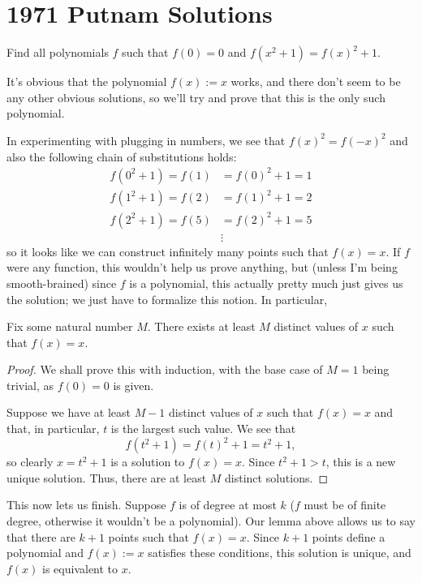 \documentclass[a4paper, 12pt]{article}
\begin{document}
\section*{1971 Putnam Solutions}

\begin{sidebox}
    \begin{problem}[A2]
        Find all polynomials \( f \) such that \( f(0) = 0 \) and \( f(x^2 + 1) = f(x)^2 + 1 \).
    \end{problem}
\end{sidebox}

\begin{solution}
    It's obvious that the polynomial \( f(x) := x \) works, and there don't seem to be any other obvious solutions, so we'll try and prove that this is the only such polynomial.

    In experimenting with plugging in numbers, we see that \( f(x)^2 = f(-x)^2 \) and also the following chain of substitutions holds:
    \begin{align*}
        f(0^2 + 1) = f(1) &= f(0)^2 + 1 = 1 \\
        f(1^2 + 1) = f(2) &= f(1)^2 + 1 = 2 \\
        f(2^2 + 1) = f(5) &= f(2)^2 + 1 = 5 \\
        &\vdots
    \end{align*}
    so it looks like we can construct infinitely many points such that \( f(x) = x \). If \( f \) were any function, this wouldn't help us prove anything, but (unless I'm being smooth-brained) since \( f \) is a polynomial, this actually pretty much just gives us the solution; we just have to formalize this notion. In particular,

    \begin{lemma}
        Fix some natural number \( M \). There exists at least \( M \) distinct values of \( x \) such that \( f(x) = x \).
    \end{lemma}

    \begin{proof}
        We shall prove this with induction, with the base case of \( M = 1 \) being trivial, as \( f(0) = 0 \) is given.

        Suppose we have at least \( M - 1 \) distinct values of \( x \) such that \( f(x) = x \) and that, in particular, \( t \) is the largest such value. We see that
        \[
            f(t^2 + 1) = f(t)^2 + 1 = t^2 + 1
        ,\]
        so clearly \( x = t^2 + 1 \) is a solution to \( f(x) = x \). Since \( t^2 + 1 > t \), this is a new unique solution. Thus, there are at least \( M \) distinct solutions.
    \end{proof}

    This now lets us finish. Suppose \( f \) is of degree at most \( k \) (\( f \) must be of finite degree, otherwise it wouldn't be a polynomial). Our lemma above allows us to say that there are \( k + 1 \) points such that \( f(x) = x \). Since \( k + 1 \) points define a polynomial and \( f(x) := x \) satisfies these conditions, this solution is unique, and \( f(x) \) is equivalent to \( x \).
\end{solution}
\end{document}
